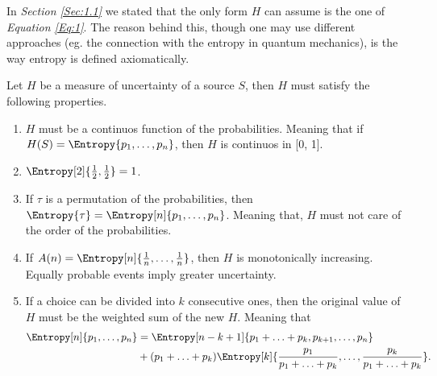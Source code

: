 \documentclass{subfiles}
\begin{document}
    In \emph{Section \ref{Sec:1.1}} we stated that the only form \(H\) can 
    assume is the one of \emph{Equation \eqref{Eq:1}}. 
    The reason behind this, though one may use different approaches 
        (eg. the connection with the entropy in quantum mechanics), 
        is the way entropy is defined axiomatically. 

    \begin{axiom*}
        Let \(H\) be a measure of uncertainty of a source \(S\), 
            then \(H\) must satisfy the following properties.
        \begin{enumerate}
            \item \(H\) must be a continuos function of the probabilities.
                Meaning that if \(H(S) = \Entropy{p_{1}, \ldots, p_{n}}\), 
                then \(H\) is continuos in [0, 1].

            \item \(\Entropy[2]{\tfrac{1}{2}, \tfrac{1}{2}} = 1\).

            \item If \(\tau\) is a permutation of the probabilities, 
                then \(\Entropy{\tau} = \Entropy[n]{p_{1}, \ldots, p_{n}}\). 
                Meaning that, \(H\) must not care of the order of the probabilities.

            \item If \(A(n) = \Entropy[n]{\tfrac{1}{n}, \ldots, \tfrac{1}{n}}\),
                then \(H\) is monotonically increasing.
                Equally probable events imply greater uncertainty.

            \item If a choice can be divided into \(k\) consecutive ones,
                then the original value of \(H\) must be the weighted sum of the new \(H\).
                Meaning that
                \[\begin{aligned}
                    \Entropy[n]{p_{1}, \ldots, p_{n}} & = 
                        \Entropy[n - k + 1]{
                            p_{1} + \ldots + p_{k}, p_{k + 1}, \ldots, p_{n}
                        } \\ 
                        & + (p_{1} + \ldots + p_{k})
                            \Entropy[k]{
                                \frac{p_{1}}{p_{1} + \ldots + p_{k}},
                                \ldots,
                                \frac{p_{k}}{p_{1} + \ldots + p_{k}}
                            }.
                \end{aligned}\]
       \end{enumerate}
    \end{axiom*} 
\end{document}
